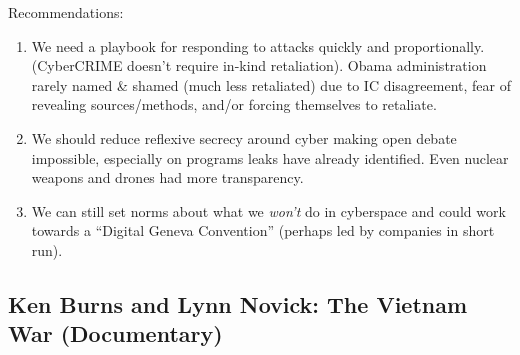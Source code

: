 \documentclass[
]{article}
\begin{document}
Recommendations:

\begin{enumerate}
\def\labelenumi{\arabic{enumi}.}
\item
  We need a playbook for responding to attacks quickly and
  proportionally. (CyberCRIME doesn't require in-kind retaliation).
  Obama administration rarely named \& shamed (much less retaliated) due
  to IC disagreement, fear of revealing sources/methods, and/or forcing
  themselves to retaliate.
\item
  We should reduce reflexive secrecy around cyber making open debate
  impossible, especially on programs leaks have already identified. Even
  nuclear weapons and drones had more transparency.
\item
  We can still set norms about what we \emph{won't} do in cyberspace and
  could work towards a ``Digital Geneva Convention'' (perhaps led by
  companies in short run).
\end{enumerate}

\hypertarget{ken-burns-and-lynn-novick-the-vietnam-war-documentary}{%
\subsection{Ken Burns and Lynn Novick: The Vietnam War
(Documentary)}\label{ken-burns-and-lynn-novick-the-vietnam-war-documentary}}
\end{document}
